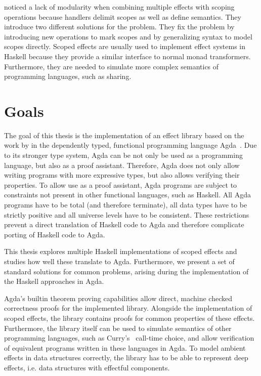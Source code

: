 \documentclass[10pt,a4paper,twoside,notitlepage]{report}
\begin{document}
\textcite{DBLP:conf/haskell/WuSH14} noticed a lack of modularity when
combining multiple effects with scoping operations because handlers delimit
scopes as well as define semantics.
They introduce two different solutions for the problem.
They fix the problem by introducing new operations to mark scopes and by
generalizing syntax to model scopes directly.
Scoped effects are usually used to implement effect systems in Haskell because
they provide a similar interface to normal monad transformers.
Furthermore, they are needed to simulate more complex semantics of programming
languages, such as sharing.


\section{Goals}

The goal of this thesis is the implementation of an effect library based on the
work by \textcite{DBLP:conf/haskell/WuSH14,DBLP:conf/lics/PirogSWJ18} in
the dependently typed, functional programming language
Agda~\cite{norell:thesis}.
Due to its stronger type system, Agda can be not only be used as a programming
language, but also as a proof assistant.
Therefore, Agda does not only allow writing programs with more expressive types,
but also allows verifying their properties.
To allow use as a proof assistant, Agda programs are subject to constraints not
present in other functional languages, such as Haskell.
All Agda programs have to be total (and therefore terminate), all data types
have to be strictly positive and all universe levels have to be consistent.
These restrictions prevent a direct translation of Haskell code to Agda and
therefore complicate porting of Haskell code to Agda.

This thesis explores multiple Haskell implementations of scoped effects and
studies how well these translate to Agda.
Furthermore, we present a set of standard solutions for common problems, arising
during the implementation of the Haskell approaches in Agda.

Agda's builtin theorem proving capabilities allow direct, machine checked
correctness proofs for the implemented library.
Alongside the implementation of scoped effects, the library contains proofs for
common properties of these effects.
Furthermore, the library itself can be used to simulate semantics of other
programming languages, such as Curry's~\cite{Hanus95curry} call-time choice, and
allow verification of equivalent programs written in these languages in Agda.
To model ambient effects in data structures correctly, the library has to be
able to represent deep effects, i.e. data structures with effectful components.
\end{document}
